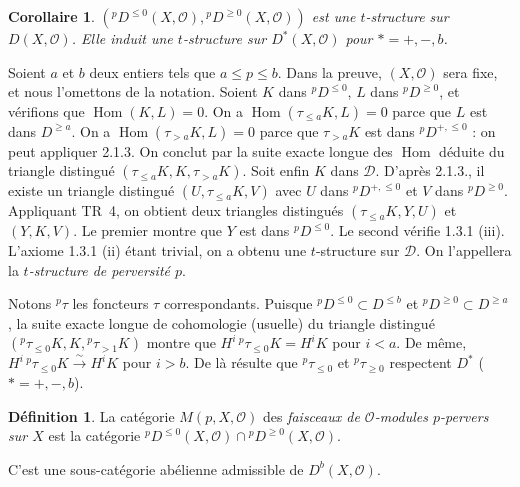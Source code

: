 \documentclass[12pt,a4paper]{article}
\theoremstyle{plain}
\newtheorem{corollary}[theorem]{Corollaire}
\theoremstyle{definition}
\newtheorem{definition}[theorem]{D\'efinition}
\DeclareMathOperator{\Hom}{Hom}
\begin{document}
\begin{corollary}\label{cor:2.1.4}
$({}^p D^{\leqslant 0}(X, \mathcal{O}), {}^p D^{\geqslant 0}(X, \mathcal{O}))$ est une $t$-structure sur $D(X, \mathcal{O})$. Elle induit une $t$-structure sur $D^*(X, \mathcal{O})$ pour $* = +, -, b$.
\end{corollary}

Soient $a$ et $b$ deux entiers tels que $a \leqslant p \leqslant b$. Dans la preuve, $(X, \mathcal{O})$ sera fixe, et nous l'omettons de la notation. Soient $K$ dans ${}^p D^{\leqslant 0}$, $L$ dans ${}^p D^{\geqslant 0}$, et v\'erifions que $\Hom(K,L) = 0$. On a $\Hom(\tau_{\leqslant a} K, L) = 0$ parce que $L$ est dans $D^{\geqslant a}$. On a $\Hom(\tau_{> a} K, L) = 0$ parce que $\tau_{> a} K$ est dans ${}^p D^{+, \leqslant 0}$ : on peut appliquer 2.1.3. On conclut par la suite exacte longue des $\Hom$ d\'eduite du triangle distingu\'e $(\tau_{\leqslant a} K, K, \tau_{> a} K)$. Soit enfin $K$ dans $\mathcal{D}$. D'apr\`es 2.1.3., il existe un triangle distingu\'e $(U, \tau_{\leqslant a} K, V)$ avec $U$ dans ${}^p D^{+, \leqslant 0}$ et $V$ dans ${}^p D^{\geqslant 0}$. Appliquant TR~4, on obtient deux triangles distingu\'es $(\tau_{\leqslant a} K, Y, U)$ et $(Y, K, V)$. Le premier montre que $Y$ est dans ${}^p D^{\leqslant 0}$. Le second v\'erifie 1.3.1 (iii). L'axiome 1.3.1 (ii) \'etant trivial, on a obtenu une $t$-structure sur $\mathcal{D}$. On l'appellera la \emph{$t$-structure de perversit\'e $p$}.

Notons ${}^p \tau$ les foncteurs $\tau$ correspondants. Puisque ${}^p D^{\leqslant 0} \subset D^{\leqslant b}$ et ${}^p D^{\geqslant 0} \subset D^{\geqslant a}$, la suite exacte longue de cohomologie (usuelle) du triangle distingu\'e $({}^p \tau_{\leqslant 0} K, K, {}^p \tau_{> 1} K)$ montre que $H^i \, {}^p \tau_{\leqslant 0} K = H^i K$ pour $i < a$. De m\^eme, $H^i \, {}^p \tau_{\leqslant 0} K \xrightarrow{\;\sim\;} H^i K$ pour $i > b$. De l\`a r\'esulte que ${}^p \tau_{\leqslant 0}$ et ${}^p \tau_{\geqslant 0}$ respectent $D^*$ ($* = +, -, b$).

\begin{definition}\label{def:2.1.5}
La cat\'egorie $M(p, X, \mathcal{O})$ des \emph{faisceaux de $\mathcal{O}$-modules $p$-pervers sur $X$} est la cat\'egorie ${}^p D^{\leqslant 0}(X, \mathcal{O}) \cap {}^p D^{\geqslant 0}(X, \mathcal{O})$.
\end{definition}

C'est une sous-cat\'egorie ab\'elienne admissible de $D^b(X, \mathcal{O})$.
\end{document}

